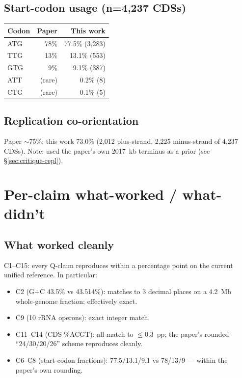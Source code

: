 \documentclass[11pt,letterpaper]{article}
\begin{document}
\subsection{Start-codon usage (n=4{,}237 CDSs)}
\begin{center}
\begin{tabular}{@{}lrr@{}}
\toprule
Codon & Paper & This work \\
\midrule
ATG  & 78\%   & 77.5\% (3,283) \\
TTG  & 13\%   & 13.1\% (553)   \\
GTG  &  9\%   &  9.1\% (387)   \\
ATT  & (rare) & 0.2\% (8)      \\
CTG  & (rare) & 0.1\% (5)      \\
\bottomrule
\end{tabular}
\end{center}

\subsection{Replication co-orientation}
Paper $\sim$75\%; this work 73.0\% (2,012 plus-strand, 2,225 minus-strand of 4,237 CDSs).
Note: used the paper's own \SI{2017}{kb} terminus as a prior (see \S\ref{sec:critique-repl}).

\section{Per-claim what-worked / what-didn't}

\subsection*{What worked cleanly}
C1--C15: every Q-claim reproduces within a percentage point on the current unified reference. In particular:
\begin{itemize}[nosep]
\item C2 (G+C 43.5\% vs 43.514\%): matches to 3 decimal places on a 4.2~Mb whole-genome fraction; effectively exact.
\item C9 (10 rRNA operons): exact integer match.
\item C11--C14 (CDS \%ACGT): all match to $\leq$0.3~pp; the paper's rounded ``24/30/20/26'' scheme reproduces cleanly.
\item C6--C8 (start-codon fractions): 77.5/13.1/9.1 vs 78/13/9 --- within the paper's own rounding.
\end{itemize}
\end{document}
